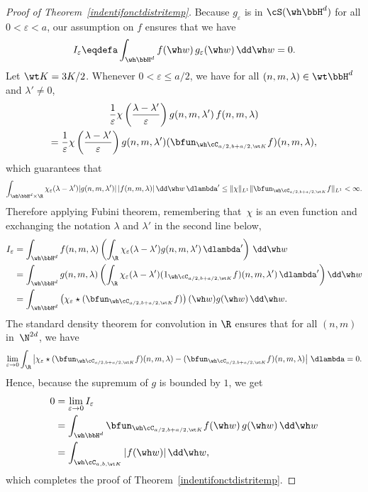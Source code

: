 \begin{proof}[Proof of Theorem~\ref{indentifonctdistritemp}]
Because $g_\varepsilon$ is in $\cS(\wh\bbH^d)$ for all $0<\varepsilon< a$, our assumption on $f$ ensures that we have
\[
I_{\varepsilon}\eqdefa \int_{\wh\bbH^d} f(\wh w)\,g_{\varepsilon}(\wh w)\,\dd\wh w=0.
\]
Let $\wt K=3K/2$. Whenever $0<\varepsilon\leq a/2$, we have for all $(n,m,\lambda)\in\wt\bbH^d$ and $\lambda'\not=0$,
\begin{multline*}
\frac1\varepsilon\chi\left(\frac {\lambda-\lambda'}\varepsilon\right) g(n,m,\lambda')\,f(n,m,\lambda) \\
= \frac1\varepsilon\chi\left(\frac {\lambda-\lambda'}\varepsilon\right) g(n,m,\lambda') (\bfun_{\wh\cC_{a/2,b+a/2,\wt K}}f)(n,m,\lambda),
\end{multline*}
which guarantees that
\[
\int_{\wh\bbH^{d}\times \R}
\chi_\varepsilon(\lambda-\lambda') |g(n,m,\lambda')|\,|f(n,m,\lambda)|\,\dd\wh w\,\dlambda'
\leq \|\chi\|_{L^1} \| \bfun_{\wh\cC_{a/2,b+a/2,\wt K}}f\|_{L^1}<\infty.
\]
Therefore applying Fubini theorem, remembering that~$\chi$ is an even function and exchanging the notation $\lambda$ and $\lambda'$ in the second line below,
\begin{align*}
I_{\varepsilon} & = \int_{\wh\bbH^d} f(n,m,\lambda)\left(\int_\R\chi_{\varepsilon}(\lambda-\lambda') g(n,m,\lambda')\,\dlambda'\right)\,\dd\wh w\\
& = \int_{\wh\bbH^d} g(n,m,\lambda)
\left(\int_\R \chi_\varepsilon(\lambda-\lambda') (1_{\wh\cC_{a/2,b+a/2,\wt K}}f)(n,m,\lambda')\,\dlambda'\right) \dd\wh w\\
& = \int_{\wh\bbH^d} \left(\chi_{\varepsilon}\star (\bfun_{\wh\cC_{a/2,b+a/2,\wt K}}f)\right)(\wh w) g(\wh w)\,\dd\wh w.
\end{align*}
The standard density theorem for convolution in $\R$ ensures that for all $(n,m)$ in~$\N^{2d}$, we have
\[
\lim_{\varepsilon\rightarrow 0}\int_\R \left|\chi_\varepsilon\star (\bfun_{\wh\cC_{a/2,b+a/2,\wt K}}f)(n,m,\lambda) -(\bfun_{\wh\cC_{a/2,b+a/2,\wt K}}f)(n,m,\lambda)\right|\,\dlambda=0.
\]
Hence, because the supremum of $g$ is bounded by $1$, we get
\begin{align*}
0 & = \lim_{\varepsilon\rightarrow 0} I_{\varepsilon}\\
&= \int_{\wh\bbH^d} \bfun_{\wh\cC_{a/2,b+a/2,\wt K}}f(\wh w)\, g(\wh w)\,\dd\wh w\\
& = \int_{\wh\cC_{a,b,\wt K}}|f(\wh w)|\,\dd\wh w,
\end{align*}
which completes the proof of Theorem~\ref{indentifonctdistritemp}.
\end{proof}

